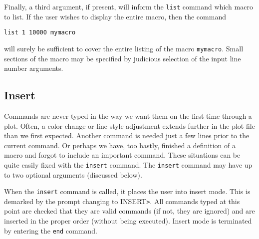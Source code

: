 Finally, a third argument, if present, will inform the {\tt list}
command which macro to list.
If the user wishes to display the entire macro, then the command
\begin{wiplist}%
  \item [\wipp] {\tt list 1 10000 mymacro}
\end{wiplist}
will surely be sufficient to cover the entire listing
of the macro {\tt mymacro}.
Small sections of the macro may be specified by judicious selection of
the input line number arguments.

\subsection*		{Insert}

Commands are never typed in the way we want them on the
first time through a plot.
Often, a color change or line style adjustment extends further
in the plot file than we first expected.
Another command is needed just a few lines prior to the current command.
Or perhaps we have, too hastly, finished a definition of
a macro and forgot to include an important command.
These situations can be quite easily fixed with the {\tt insert} command.
The {\tt insert} command may have up to two optional arguments
(discussed below).

When the {\tt insert} command is called, it places the user into insert mode.
This is demarked by the prompt changing to {\rm INSERT\verb+>+}.
All commands typed at this point are checked that they are valid
commands (if not, they are ignored) and are inserted in the
proper order (without being executed).
Insert mode is terminated by entering the {\tt end} command.

